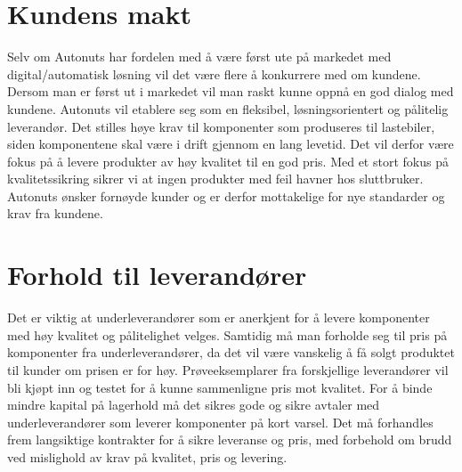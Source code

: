 \section{Kundens makt}
Selv om Autonuts har fordelen med å være først ute på markedet med digital/automatisk løsning vil det være flere å konkurrere med om kundene. Dersom man er først ut i markedet vil 
man raskt kunne oppnå en god dialog med kundene. Autonuts vil etablere seg som en 
fleksibel, løsningsorientert og pålitelig leverandør. Det stilles høye krav 
til komponenter som produseres til lastebiler, siden komponentene skal være i 
drift gjennom en lang levetid. Det vil derfor være fokus på å levere produkter 
av høy kvalitet til en god pris. Med et stort fokus på 
kvalitetssikring sikrer vi at ingen produkter med feil havner hos 
sluttbruker. Autonuts ønsker fornøyde kunder og er derfor mottakelige for nye 
standarder og krav fra kundene. 

\section{Forhold til leverandører}
Det er viktig at  underleverandører som er anerkjent for å levere 
komponenter med høy kvalitet og pålitelighet velges. Samtidig må man forholde seg til 
pris på komponenter fra underleverandører, da det vil være vanskelig å få 
solgt produktet til kunder om prisen er for høy. Prøveeksemplarer fra forskjellige leverandører 
vil bli kjøpt inn og testet for å kunne sammenligne pris mot kvalitet. For å binde 
mindre kapital på lagerhold må det sikres gode og sikre avtaler med underleverandører som 
leverer komponenter på kort varsel. Det må forhandles frem langsiktige kontrakter 
for å sikre leveranse og pris, med forbehold om brudd ved mislighold av krav 
på kvalitet, pris og levering. 

